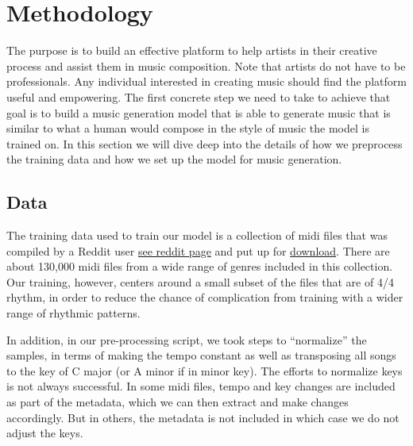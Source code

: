\documentclass[12pt,oneside]{chicagocapstone}
\begin{document}
\newpage

\hypertarget{methodology}{%
\chapter*{Methodology}\label{methodology}}

The purpose is to build an effective platform to help artists in their creative process and assist them in music composition. Note that artists do not have to be professionals. Any individual interested in creating music should find the platform useful and empowering. The first concrete step we need to take to achieve that goal is to build a music generation model that is able to generate music that is similar to what a human would compose in the style of music the model is trained on. In this section we will dive deep into the details of how we preprocess the training data and how we set up the model for music generation.

\hypertarget{methodology-data}{%
\section*{Data}\label{methodology-data}}

The training data used to train our model is a collection of midi files that was compiled by a Reddit user \href{https://www.reddit.com/r/WeAreTheMusicMakers/comments/3ajwe4/the_largest_midi_collection_on_the_internet/}{see reddit page} and put up for \href{https://mega.co.nz/\#!Elg1TA7T!MXEZPzq9s9YObiUcMCoNQJmCbawZqzAkHzY4Ym6Gs_Q}{download}. There are about 130,000 midi files from a wide range of genres included in this collection. Our training, however, centers around a small subset of the files that are of 4/4 rhythm, in order to reduce the chance of complication from training with a wider range of rhythmic patterns.

In addition, in our pre-processing script, we took steps to ``normalize'' the samples, in terms of making the tempo constant as well as transposing all songs to the key of C major (or A minor if in minor key). The efforts to normalize keys is not always successful. In some midi files, tempo and key changes are included as part of the metadata, which we can then extract and make changes accordingly. But in others, the metadata is not included in which case we do not adjust the keys.
\end{document}

